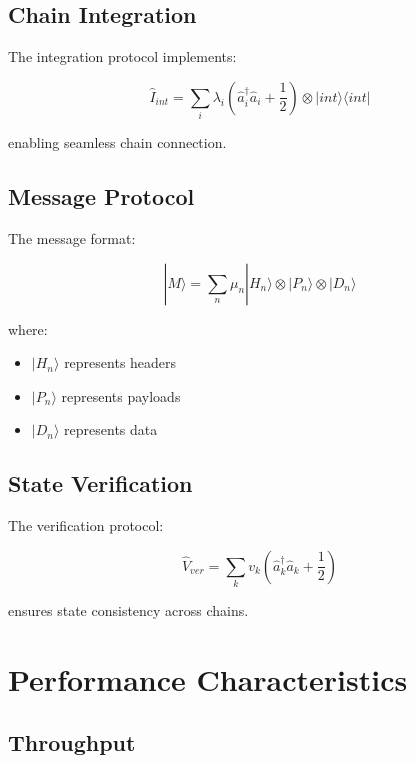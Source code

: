 \documentclass[12pt]{article}
\begin{document}
\subsection{Chain Integration}

The integration protocol implements:

\begin{equation}
\hat{I}_{int} = \sum_i \lambda_i(\hat{a}_i^\dagger\hat{a}_i + \frac{1}{2}) \otimes |int\rangle\langle int|
\end{equation}

enabling seamless chain connection.

\subsection{Message Protocol}

The message format:

\begin{equation}
|M\rangle = \sum_n \mu_n|H_n\rangle \otimes |P_n\rangle \otimes |D_n\rangle
\end{equation}

where:
\begin{itemize}
\item $|H_n\rangle$ represents headers
\item $|P_n\rangle$ represents payloads
\item $|D_n\rangle$ represents data
\end{itemize}

\subsection{State Verification}

The verification protocol:

\begin{equation}
\hat{V}_{ver} = \sum_k v_k(\hat{a}_k^\dagger\hat{a}_k + \frac{1}{2})
\end{equation}

ensures state consistency across chains.

\section{Performance Characteristics}

\subsection{Throughput}
\end{document}
